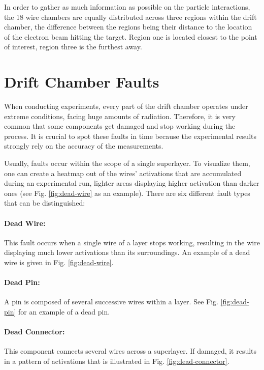 In order to gather as much information as possible on the particle
interactions, the 18 wire chambers are equally distributed across
three regions within the drift chamber, the difference between the
regions being their distance to the location of the electron beam
hitting the target. Region one is located closest to the point of
interest, region three is the furthest away.

\section{Drift Chamber Faults}
\label{sec:faults}

When conducting experiments, every part of the drift chamber
operates under extreme conditions, facing huge amounts of
radiation. Therefore, it is very common that
some components get damaged and stop working during the process. It
is crucial to spot these faults in time because the experimental
results strongly rely on the accuracy of the measurements.

Usually, faults occur within the scope of a single superlayer. To
visualize them, one can create a heatmap out of the wires' activations
that are accumulated during an experimental run, lighter areas
displaying higher activation than darker ones (see
Fig. \ref{fig:dead-wire} as an example). There are six different fault
types that can be distinguished:

\paragraph{Dead Wire:}
This fault occurs when a single wire
of a layer stops working, resulting in the wire displaying much lower
activations than its surroundings. An example of a dead wire is given
in Fig. \ref{fig:dead-wire}.

\paragraph{Dead Pin:}
A pin is composed of several successive
wires within a layer. See Fig. \ref{fig:dead-pin} for
an example of a dead pin.

\paragraph{Dead Connector:}
This component connects several wires
across a superlayer. If damaged, it results in a pattern of
activations that is illustrated in Fig. \ref{fig:dead-connector}.

